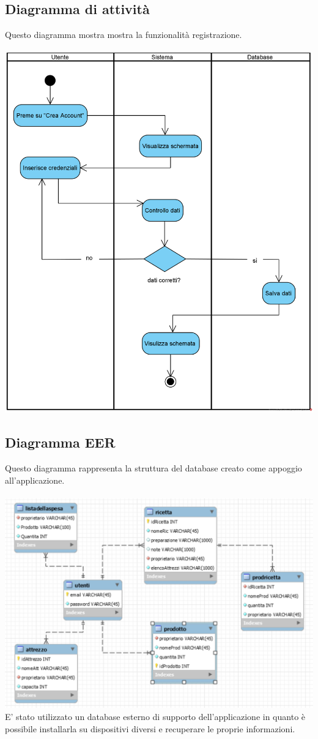 \documentclass[a4paper, titlepage]{article}
\begin{document}
\subsection{Diagramma di attività}
Questo diagramma mostra mostra la funzionalità registrazione.\\\\
\includegraphics[scale=0.50]{Immagini/Activity Diagram Registrazione_Brew Day!.png}
\subsection{Diagramma EER}
Questo diagramma rappresenta la struttura del database creato come appoggio all'applicazione.\\\\
\includegraphics[scale=0.50]{Immagini/diagrammaER.PNG}
\\E' stato utilizzato un database esterno di supporto dell'applicazione in quanto è possibile installarla su dispositivi diversi e recuperare le proprie informazioni.
\newpage
\end{document}
